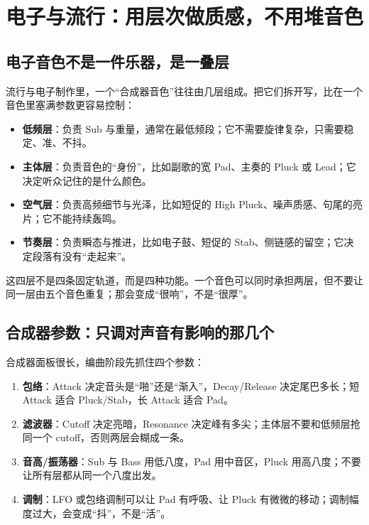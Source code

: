\chapter{电子与流行：用层次做质感，不用堆音色}
\label{ch:electronic}


\section{电子音色不是一件乐器，是一叠层}
\label{sec:electronic-layers}

流行与电子制作里，一个“合成器音色”往往由几层组成。把它们拆开写，比在一个音色里塞满参数更容易控制：

\begin{itemize}
\item \textbf{低频层}：负责 Sub 与重量，通常在最低频段；它不需要旋律复杂，只需要稳定、准、不抖。
\item \textbf{主体层}：负责音色的“身份”，比如副歌的宽 Pad、主奏的 Pluck 或 Lead；它决定听众记住的是什么颜色。
\item \textbf{空气层}：负责高频细节与光泽，比如短促的 High Pluck、噪声质感、句尾的亮片；它不能持续轰鸣。
\item \textbf{节奏层}：负责瞬态与推进，比如电子鼓、短促的 Stab、侧链感的留空；它决定段落有没有“走起来”。
\end{itemize}

这四层不是四条固定轨道，而是四种功能。一个音色可以同时承担两层，但不要让同一层由五个音色重复；那会变成“很响”，不是“很厚”。

\section{合成器参数：只调对声音有影响的那几个}
\label{sec:synth-params}

合成器面板很长，编曲阶段先抓住四个参数：

\begin{enumerate}
\item \textbf{包络}：Attack 决定音头是“啪”还是“渐入”，Decay/Release 决定尾巴多长；短 Attack 适合 Pluck/Stab，长 Attack 适合 Pad。
\item \textbf{滤波器}：Cutoff 决定亮暗，Resonance 决定峰有多尖；主体层不要和低频层抢同一个 cutoff，否则两层会糊成一条。
\item \textbf{音高/振荡器}：Sub 与 Bass 用低八度，Pad 用中音区，Pluck 用高八度；不要让所有层都从同一个八度出发。
\item \textbf{调制}：LFO 或包络调制可以让 Pad 有呼吸、让 Pluck 有微微的移动；调制幅度过大，会变成“抖”，不是“活”。
\end{enumerate}

